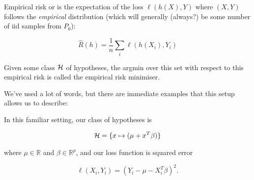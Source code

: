 \documentclass[11pt]{scrartcl}
\begin{document}
\begin{definition}
Empirical risk or  is the expectation of the loss $\ell (h(X), Y)$ where $(X,Y)$ follows the \textit{empirical} distribution (which will generally (always?) be some number of iid samples from $P_0$):

\begin{equation}
    \hat{R}(h) = \frac1n \sum_i \ell (h(X_i), Y_i)
\label{L2:ER}
\end{equation}
\end{definition}

Given some class $\mathcal{H}$ of hypotheses, the argmin over this set with respect to this empirical risk is called the empirical risk minimiser.

We've used a lot of words, but there are immediate examples that this setup allows us to describe:

\begin{example}

In this familiar setting, our class of hypotheses is

\begin{equation}
    \mathcal{H} = \{ x \mapsto (\mu + x^T \beta) \}
\label{L2:Linear Regression H}
\end{equation}

where $\mu \in \mathbb{R}$ and $\beta \in \mathbb{R}^p$, and our loss function is squared error

\begin{equation}
    \ell(X_i,Y_i) = (Y_i - \mu - X_i^T \beta)^2.
\end{equation}
\end{example}
\end{document}
